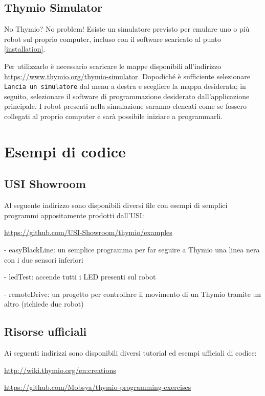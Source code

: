 \documentclass[12pt]{article}
\begin{document}
	\subsection{Thymio Simulator}
	
		No Thymio? No problem! Esiste un simulatore previsto per emulare uno o più robot sul proprio computer, incluso con il software scaricato al punto \ref{installation}.
		
		Per utilizzarlo è necessario scaricare le mappe disponibili all'indirizzo \url{https://www.thymio.org/thymio-simulator}. Dopodiché è sufficiente selezionare \texttt{Lancia un simulatore} dal menu a destra e scegliere la mappa desiderata; in seguito, selezionare il software di programmazione desiderato dall'applicazione principale.
		I robot presenti nella simulazione saranno elencati come se fossero collegati al proprio computer e sarà possibile iniziare a programmarli.
		
		
\section{Esempi di codice}

	\subsection{USI Showroom}\label{usiRepo}
		
		Al seguente indirizzo sono disponibili diversi file con esempi di semplici programmi appositamente prodotti dall'USI:
		
		\url{https://github.com/USI-Showroom/thymio/examples}
		
		
		- easyBlackLine: un semplice programma per far seguire a Thymio una linea nera con i due sensori inferiori
		
		- ledTest: accende tutti i LED presenti sul robot
		
		- remoteDrive: un progetto per controllare il movimento di un Thymio tramite un altro (richiede due robot)
		
	
	\subsection{Risorse ufficiali}
	
		Ai seguenti indirizzi sono disponibili diversi tutorial ed esempi ufficiali di codice:
	
		\url{http://wiki.thymio.org/en:creations}
		
		\url{https://github.com/Mobsya/thymio-programming-exercises}
		
\end{document}
